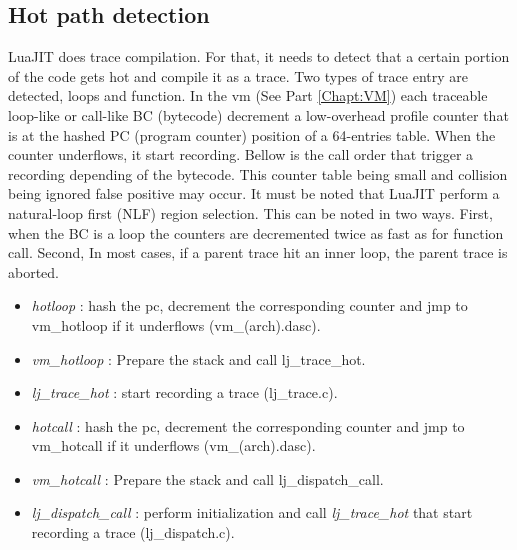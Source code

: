 

\subsection{Hot path detection}
\label{Subsec:hot-path}

LuaJIT does trace compilation. For that, it needs to detect that a certain
portion of the code gets hot and compile it as a trace. Two types of trace entry
are detected, loops and function. In the vm (See Part \ref{Chapt:VM}) each
traceable loop-like or call-like BC (bytecode) decrement a low-overhead profile
counter that is at the hashed PC (program counter) position of a 64-entries table.
When the counter underflows, it start recording. Bellow is the call order that
trigger a recording depending of the bytecode. This counter table being small
and collision being ignored false positive may occur.
It must be noted that LuaJIT perform a natural-loop first (NLF) region selection.
This can be noted in two ways. First, when the BC is a loop the counters are
decremented twice as fast as for function call. Second, In most cases, if a
parent trace hit an inner loop, the parent trace is aborted.


\begin{itemize}
	\item \emph{hotloop} : hash the pc, decrement the corresponding counter and
jmp to vm\_hotloop if it underflows (vm\_(arch).dasc).
	\item \emph{vm\_hotloop} : Prepare the stack and call lj\_trace\_hot.
	\item \emph{lj\_trace\_hot} : start recording a trace (lj\_trace.c).
\end{itemize}


\begin{itemize}
	\item \emph{hotcall} : hash the pc, decrement the corresponding counter and
jmp to vm\_hotcall if it underflows (vm\_(arch).dasc).
	\item \emph{vm\_hotcall} : Prepare the stack and call lj\_dispatch\_call.
	\item \emph{lj\_dispatch\_call} : perform initialization
	and call \emph{lj\_trace\_hot} that start recording a trace (lj\_dispatch.c).
\end{itemize}

